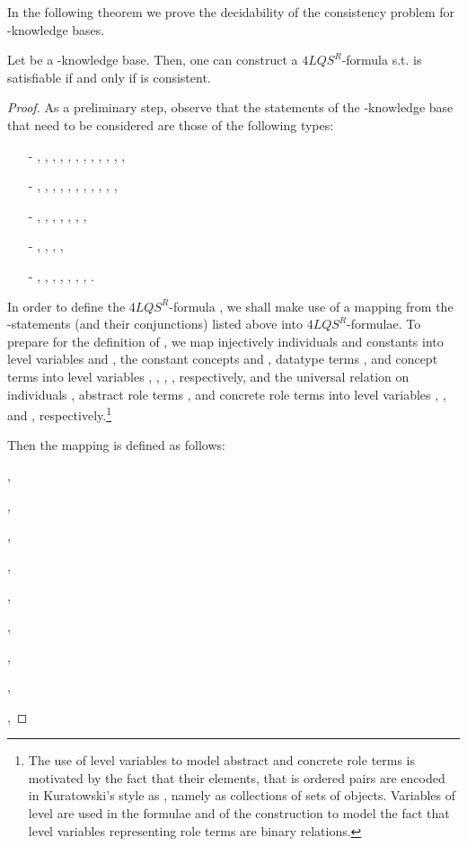 \documentclass[a4paper]{llncs}
\newcommand{\flqsr}{\ensuremath{4LQS^R}}
\begin{document}
In the following theorem we prove the decidability of the consistency problem for -knowledge bases.

\begin{theorem}\label{theorem}
Let  be a -knowledge base. Then, one can construct a \flqsr-formula  s.t.  is satisfiable if and only if  is consistent.  \end{theorem}
\begin{proof}
As a preliminary step, observe that the statements of the -knowledge base  that need to be considered  are those of the following types:
\begin{itemize}
\item[-] , , , , , , , , , , , ,
\item[-] , , , , , , , , , , ,
\item[-] , , , , , , ,
\item[-] , , , ,
\item[-] , , , , ,
, , .
\end{itemize}
In order to define the \flqsr-formula , we shall make use of a mapping  from the -statements (and their conjunctions) listed above into \flqsr-formulae. To prepare for the definition of , we map injectively individuals  and constants  into level  variables  and , the constant concepts  and , datatype terms , and concept terms  into level  variables , , , , respectively, and the universal relation on individuals , abstract role terms , and concrete role terms  into level  variables , , and , respectively.\footnote{The use of level  variables to model abstract and concrete role terms is motivated by the fact that their elements, that is ordered pairs  are encoded in Kuratowski's style as , namely as collections of sets of objects. Variables of level  are used in the formulae  and  of the construction to model the fact that level  variables representing role terms are binary relations.}


Then the mapping  is defined as follows:
\smallskip

{\small
\noindent ,

\noindent ,

\noindent ,

\noindent ,

\noindent ,

\noindent ,

\noindent ,

\noindent 

\noindent ,

\noindent 

\noindent ,

}
\end{proof}
\end{document}

